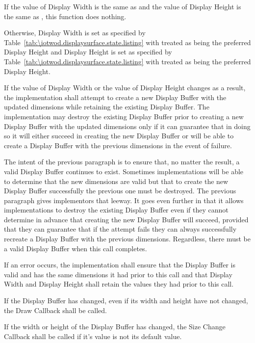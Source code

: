 \begin{itemdescr}
\pnum
\effects
If the value of Display Width is the same as  and the value of Display Height is the same as , this function does nothing.

\pnum
Otherwise, Display Width is set as specified by Table~\ref{tab:\iotwod.displaysurface.state.listing} with  treated as being the preferred Display Height and Display Height is set as specified by Table~\ref{tab:\iotwod.displaysurface.state.listing} with  treated as being the preferred Display Height.

\pnum
If the value of Display Width or the value of Display Height changes as a result, the implementation shall attempt to create a new Display Buffer with the updated dimensions while retaining the existing Display Buffer. The implementation may destroy the existing Display Buffer prior to creating a new Display Buffer with the updated dimensions only if it can guarantee that in doing so it will either succeed in creating the new Display Buffer or will be able to create a Display Buffer with the previous dimensions in the event of failure.

\pnum
\begin{note}
The intent of the previous paragraph is to ensure that, no matter the result, a valid Display Buffer continues to exist. Sometimes implementations will be able to determine that the new dimensions are valid but that to create the new Display Buffer successfully the previous one must be destroyed. The previous paragraph gives implementors that leeway. It goes even further in that it allows implementations to destroy the existing Display Buffer even if they cannot determine in advance that creating the new Display Buffer will succeed, provided that they can guarantee that if the attempt fails they can always successfully recreate a Display Buffer with the previous dimensions. Regardless, there must be a valid Display Buffer when this call completes.
\end{note}

\pnum
If an error occurs, the implementation shall ensure that the Display Buffer is valid and has the same dimensions it had prior to this call and that Display Width and Display Height shall retain the values they had prior to this call.

\pnum
If the Display Buffer has changed, even if its width and height have not changed, the Draw Callback shall be called.

\pnum
If the width or height of the Display Buffer has changed, the Size Change Callback shall be called if it's value is not its default value.


\end{itemdescr}
